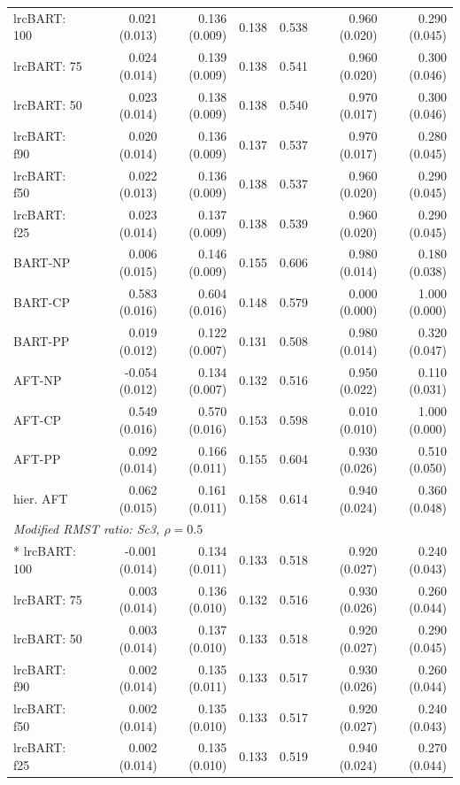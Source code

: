 \begin{landscape}
\begin{longtable}{lrrrrrr}
lrcBART: 100 & 0.021 (0.013) & 0.136 (0.009) & 0.138 & 0.538 & 0.960 (0.020) & 0.290 (0.045) \\
lrcBART: 75 & 0.024 (0.014) & 0.139 (0.009) & 0.138 & 0.541 & 0.960 (0.020) & 0.300 (0.046) \\
lrcBART: 50 & 0.023 (0.014) & 0.138 (0.009) & 0.138 & 0.540 & 0.970 (0.017) & 0.300 (0.046) \\
lrcBART: f90 & 0.020 (0.014) & 0.136 (0.009) & 0.137 & 0.537 & 0.970 (0.017) & 0.280 (0.045) \\
lrcBART: f50 & 0.022 (0.013) & 0.136 (0.009) & 0.138 & 0.537 & 0.960 (0.020) & 0.290 (0.045) \\
lrcBART: f25 & 0.023 (0.014) & 0.137 (0.009) & 0.138 & 0.539 & 0.960 (0.020) & 0.290 (0.045) \\
BART-NP & 0.006 (0.015) & 0.146 (0.009) & 0.155 & 0.606 & 0.980 (0.014) & 0.180 (0.038) \\
BART-CP & 0.583 (0.016) & 0.604 (0.016) & 0.148 & 0.579 & 0.000 (0.000) & 1.000 (0.000) \\
BART-PP & 0.019 (0.012) & 0.122 (0.007) & 0.131 & 0.508 & 0.980 (0.014) & 0.320 (0.047) \\
AFT-NP & -0.054 (0.012) & 0.134 (0.007) & 0.132 & 0.516 & 0.950 (0.022) & 0.110 (0.031) \\
AFT-CP & 0.549 (0.016) & 0.570 (0.016) & 0.153 & 0.598 & 0.010 (0.010) & 1.000 (0.000) \\
AFT-PP & 0.092 (0.014) & 0.166 (0.011) & 0.155 & 0.604 & 0.930 (0.026) & 0.510 (0.050) \\
hier. AFT & 0.062 (0.015) & 0.161 (0.011) & 0.158 & 0.614 & 0.940 (0.024) & 0.360 (0.048) \\
\multicolumn{7}{l}{\strut\textit{Modified RMST ratio: Sc3, $\rho=0.5$}}\\*
lrcBART: 100 & -0.001 (0.014) & 0.134 (0.011) & 0.133 & 0.518 & 0.920 (0.027) & 0.240 (0.043) \\
lrcBART: 75 & 0.003 (0.014) & 0.136 (0.010) & 0.132 & 0.516 & 0.930 (0.026) & 0.260 (0.044) \\
lrcBART: 50 & 0.003 (0.014) & 0.137 (0.010) & 0.133 & 0.518 & 0.920 (0.027) & 0.290 (0.045) \\
lrcBART: f90 & 0.002 (0.014) & 0.135 (0.011) & 0.133 & 0.517 & 0.930 (0.026) & 0.260 (0.044) \\
lrcBART: f50 & 0.002 (0.014) & 0.135 (0.010) & 0.133 & 0.517 & 0.920 (0.027) & 0.240 (0.043) \\
lrcBART: f25 & 0.002 (0.014) & 0.135 (0.010) & 0.133 & 0.519 & 0.940 (0.024) & 0.270 (0.044) \\

\end{longtable}
\end{landscape}
